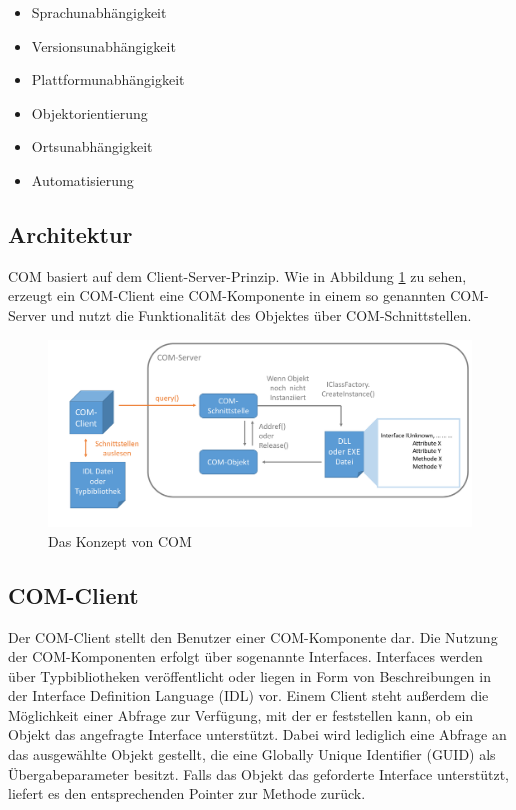 \begin{itemize}
\item Sprachunabhängigkeit
\item Versionsunabhängigkeit
\item Plattformunabhängigkeit
\item Objektorientierung
\item Ortsunabhängigkeit
\item Automatisierung
\end{itemize} 

\subsection{Architektur}
\label{ch:grundlagen:sec:ComponentObjectModel:subsec:Architektur}

COM basiert auf dem Client-Server-Prinzip. Wie in Abbildung \ref{GL_COM} zu sehen, erzeugt ein COM-Client eine COM-Komponente in einem so genannten COM-Server und nutzt die Funktionalität des Objektes über COM-Schnittstellen. 

\begin{figure}[htbp]
	\centering
  \includegraphics[width=1.0\textwidth, width=1.0\textwidth]{pics/Grundlagen_com.pdf}
	\caption{Das Konzept von COM}
	\label{GL_COM}
\end{figure} 

\subsection{COM-Client}
\label{ch:grundlagen:sec:ComponentObjectModel:subsec:COMClient}

Der COM-Client stellt den Benutzer einer COM-Komponente dar. Die Nutzung der COM-Komponenten erfolgt über sogenannte Interfaces. Interfaces werden über Typbibliotheken veröffentlicht oder liegen in Form von Beschreibungen in der Interface Definition Language (IDL) vor. Einem Client steht außerdem die Möglichkeit einer Abfrage zur Verfügung, mit der er feststellen kann, ob ein Objekt das angefragte Interface unterstützt. Dabei wird lediglich eine Abfrage an das ausgewählte Objekt gestellt, die eine Globally Unique Identifier (GUID) als Übergabeparameter besitzt. Falls das Objekt das geforderte Interface unterstützt, liefert es den entsprechenden Pointer zur Methode zurück.  

